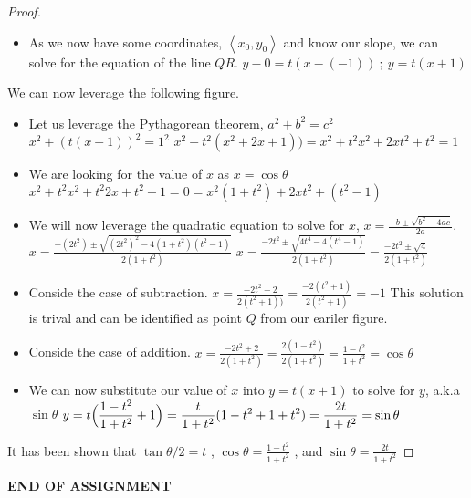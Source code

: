 \documentclass[10pt]{article}
\theoremstyle{plain}
\begin{document}
\begin{proof}
\begin{itemize}
    \item As we now have some coordinates, $\left< x_{0},y_{0} \right>$ and know our slope, we can solve for the equation of the line $QR$.
    \subitem $y-0 = t(x-(-1)) \ ; \ y = t(x+1)$
  \end{itemize}
  We can now leverage the following figure.
  \begin{center}
  \end{center}
  \begin{itemize}
    \item Let us leverage the Pythagorean theorem, $a^{2}+b^{2}=c^{2}$
    \subitem $x^{2}+(t(x+1))^{2}=1^{2}$
    \subitem $x^{2}+t^{2}(x^{2}+2x+1))=x^{2}+t^{2}x^{2}+2xt^{2}+t^{2}=1$
    \item We are looking for the value of $x$ as $x=\cos{\theta}$
    \subitem $x^{2}+t^{2}x^{2}+t^{2}2x+t^{2}-1=0=x^{2}(1+t^{2})+2xt^{2}+(t^{2}-1)$
    \item We will now leverage the quadratic equation to solve for $x$, $\displaystyle x=\frac{-b\pm\sqrt{b^{2}-4ac}}{2a}$.
    \subitem $\displaystyle x=\frac{-(2t^{2})\pm\sqrt{(2t^{2})^{2}-4(1+t^{2})(t^{2}-1)}}{2(1+t^{2})}$
    \subitem $\displaystyle x=\frac{-2t^{2}\pm\sqrt{4t^{4}-4(t^{4}-1)}}{2(1+t^{2})}=\frac{-2t^{2}\pm\sqrt{4}}{2(1+t^{2})}$
    \item Conside the case of subtraction.
    \subitem $\displaystyle x=\frac{-2t^{2}-2}{2(t^{2}+1))}=\frac{-2(t^{2}+1)}{2(t^{2}+1)}=-1$
    \subitem This solution is trival and can be identified as point $Q$ from our eariler figure.
    \item Conside the case of addition.
    \subitem $\displaystyle x=\frac{-2t^{2}+2}{2(1+t^{2})}=\frac{2(1-t^{2})}{2(1+t^{2})}=\frac{1-t^{2}}{1+t^{2}}=\cos{\theta}$
    \item We can now substitute our value of $x$ into $y=t(x+1)$ to solve for $y$, a.k.a $\sin{\theta}$
    \subitem $\displaystyle y=t\Bigl(\frac{1-t^{2}}{1+t^{2}}+1\Bigr)=\frac{t}{1+t^{2}}(1-t^{2}+1+t^{2})=\frac{2t}{1+t^{2}}=\sin{\theta}$
  \end{itemize}
  It has been shown that $\displaystyle \tan{\theta/2}=t$ , $\displaystyle \cos{\theta}=\frac{1-t^{2}}{1+t^{2}}$ , and $\displaystyle \sin{\theta}=\frac{2t}{1+t^{2}}$
\end{proof}

\hrulefill

\begin{center}
  \textbf{END OF ASSIGNMENT}
\end{center}
\end{document}
